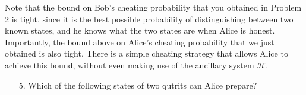 \begin{exercises}
\begin{enumerate}
\end{enumerate}
Note that the bound on Bob's cheating probability that you obtained in Problem 2 is tight, since it is the best possible probability of distinguishing between two known states, and he knows what the two states are when Alice is honest. \\
Importantly, the bound above on Alice's cheating probability that we just obtained is also tight. There is a simple cheating strategy that allows Alice to achieve this bound, without even making use of the ancillary system $\mathcal{H}$.
\begin{enumerate}
\item[5.] Which of the following states of two qutrits can Alice prepare?

\end{enumerate}
\end{exercises}
